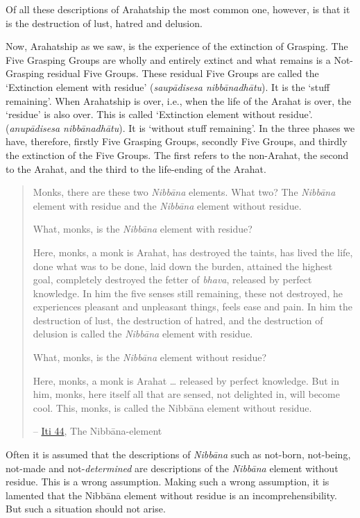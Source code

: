 Of all these descriptions of Arahatship the most common one, however, is that it is the destruction of lust, hatred and delusion.

\protect\hypertarget{remainder}{}{}Now, Arahatship as we saw, is the experience of the extinction of Grasping. The Five Grasping Groups are wholly and entirely extinct and what remains is a Not-Grasping residual Five Groups. These residual Five Groups are called the `Extinction element with residue' (\emph{saupādisesa nibbānadhātu}). It is the `stuff remaining'. When Arahatship is over, i.e., when the life of the Arahat is over, the `residue' is also over. This is called `Extinction element without residue'. (\emph{anupādisesa nibbānadhātu}). It is `without stuff remaining'. In the three phases we have, therefore, firstly Five Grasping Groups, secondly Five Groups, and thirdly the extinction of the Five Groups. The first refers to the non-Arahat, the second to the Arahat, and the third to the life-ending of the Arahat.

\begin{quote}
Monks, there are these two \emph{Nibbāna} elements. What two? The \emph{Nibbāna} element with residue and the \emph{Nibbāna} element without residue.

What, monks, is the \emph{Nibbāna} element with residue?

Here, monks, a monk is Arahat, has destroyed the taints, has lived the life, done what was to be done, laid down the burden, attained the highest goal, completely destroyed the fetter of \emph{bhava}, released by perfect knowledge. In him the five senses still remaining, these not destroyed, he experiences pleasant and unpleasant things, feels ease and pain. In him the destruction of lust, the destruction of hatred, and the destruction of delusion is called the \emph{Nibbāna} element with residue.

What, monks, is the \emph{Nibbāna} element without residue?

Here, monks, a monk is Arahat \ldots\hspace{0pt} released by perfect knowledge. But in him, monks, here itself all that are sensed, not delighted in, will become cool. This, monks, is called the Nibbāna element without residue.

 -- \href{https://suttacentral.net/iti44/en/ireland}{Iti 44}, The Nibbāna-element
\end{quote}

Often it is assumed that the descriptions of \emph{Nibbāna} such as not-born, not-being, not-made and not-\emph{determined} are descriptions of the \emph{Nibbāna} element without residue. This is a wrong assumption. Making such a wrong assumption, it is lamented that the Nibbāna element without residue is an incomprehensibility. But such a situation should not arise.

